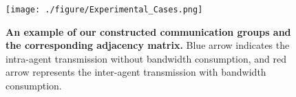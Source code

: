 \begin{figure}[t]
    \vspace{1mm}
    \begin{center}
    \centerline{\texttt{[image: ./figure/Experimental\_Cases.png]}}
    \caption{
        \textbf{An example of our constructed communication groups and the corresponding adjacency matrix.} Blue arrow indicates the intra-agent transmission without bandwidth consumption, and red arrow represents the inter-agent transmission with    bandwidth consumption.}
        \label{fig:experimental_cases}

    \end{center}
    \vspace{-6mm}
\end{figure}